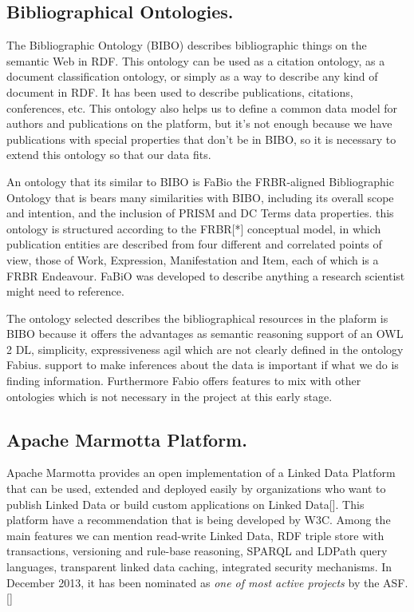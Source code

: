 \documentclass[11pt]{article}
\begin{document}
\subsection{Bibliographical Ontologies.}
The Bibliographic Ontology (BIBO) \cite{Frederick} describes bibliographic things on the semantic Web in RDF. This ontology can be used as a citation ontology, as a document classification ontology, or simply as a way to describe any kind of document in RDF. It has been used to describe publications, citations, conferences, etc. This ontology also helps us to define a common data model for authors and publications on the platform, but it's not enough because we have publications with special properties that don't be in BIBO, so it is necessary to extend this ontology so that our data fits. 

An ontology that its similar to BIBO is  FaBio the FRBR-aligned \cite{Edward} Bibliographic Ontology that is bears many similarities with BIBO, including its overall scope and intention, and the inclusion of PRISM and DC Terms data properties.  this ontology is structured according to the FRBR[*] conceptual model, in which publication entities are described from four different and correlated points of view, those of Work, Expression, Manifestation and Item, each of which is a FRBR Endeavour. FaBiO was developed to describe anything a research scientist might need to reference.

The ontology selected describes the bibliographical resources in the plaform is BIBO because it offers the advantages as semantic reasoning support of an OWL 2 DL, simplicity, expressiveness agil which are not clearly defined in the ontology Fabius. support to make inferences about the data is important if what we do is finding information. Furthermore Fabio offers features to mix with other ontologies which is not necessary in the project at this early stage.

\subsection{Apache Marmotta Platform.}
Apache Marmotta provides an open implementation of a Linked Data Platform that can be used, extended and deployed easily by organizations who want to publish Linked Data or build custom applications on Linked Data[]. This platform have a recommendation that is being developed by W3C. Among the main features we can mention read-write Linked Data, RDF triple store with transactions, versioning and rule-base reasoning, SPARQL and LDPath query languages, transparent linked data caching, integrated security mechanisms. In December 2013, it has been nominated as \emph{one of most active projects} by the ASF. []
\end{document}
